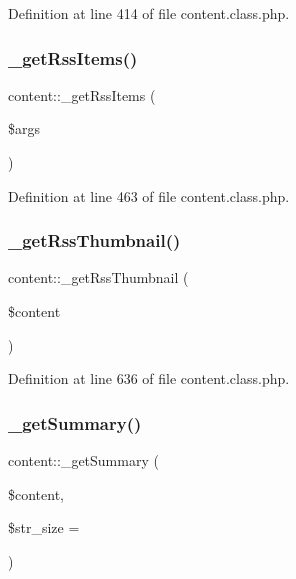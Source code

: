Definition at line 414 of file content.\+class.\+php.

\mbox{\label{classcontent_aa541a575f915fc5fddbd5075a545d991}} 
\subsubsection{\texorpdfstring{\+\_\+get\+Rss\+Items()}{\_getRssItems()}}
{\footnotesize\ttfamily content\+::\+\_\+get\+Rss\+Items (\begin{DoxyParamCaption}\item[{}]{\$args }\end{DoxyParamCaption})}



Definition at line 463 of file content.\+class.\+php.

\mbox{\label{classcontent_afe1cfad315cf8f3aeb352b22d0020142}} 
\subsubsection{\texorpdfstring{\+\_\+get\+Rss\+Thumbnail()}{\_getRssThumbnail()}}
{\footnotesize\ttfamily content\+::\+\_\+get\+Rss\+Thumbnail (\begin{DoxyParamCaption}\item[{}]{\$content }\end{DoxyParamCaption})}



Definition at line 636 of file content.\+class.\+php.

\mbox{\label{classcontent_ae3e4dc54c21e3ac9eb67d547d914661a}} 
\subsubsection{\texorpdfstring{\+\_\+get\+Summary()}{\_getSummary()}}
{\footnotesize\ttfamily content\+::\+\_\+get\+Summary (\begin{DoxyParamCaption}\item[{}]{\$content,  }\item[{}]{\$str\+\_\+size = {} }\end{DoxyParamCaption})}



